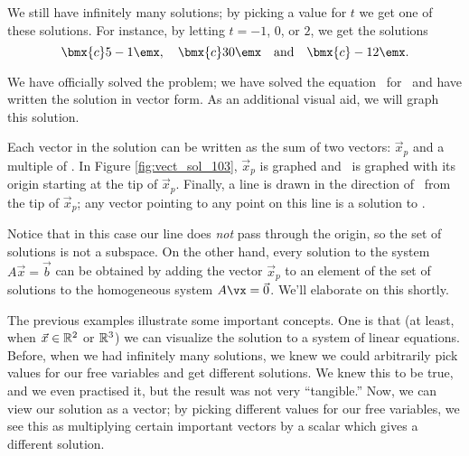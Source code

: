 {We still have infinitely many solutions; by picking a value for $t$ we get one of these solutions. For instance, by letting $t= -1$, $0$, or $2$, we get the solutions 
\[
\bmx{c} 5\\-1\emx, \quad \bmx{c} 3\\0\emx \quad \text{and} \quad \bmx{c} -1\\2\emx.
\]


We have officially solved the problem; we have solved the equation \ttaxb\ for \vx\ and have written the solution in vector form. As an additional visual aid, we will graph this solution. 

Each vector in the solution can be written as the sum of two vectors: $\vec{x}_p$ and a multiple of \vv. In Figure \ref{fig:vect_sol_103}, $\vec{x}_p$ is graphed and \vv\ is graphed with its origin starting at the tip of $\vec{x}_p$. Finally, a line is drawn in the direction of \vv\ from the tip of $\vec{x}_p$; any vector pointing to any point on this line is a solution to \ttaxb.


Notice that in this case our line does \textit{not} pass through the origin, so the set of solutions is not a subspace. On the other hand, every solution to the system $A\vec x = \vec b$ can be obtained by adding the vector $\vec{x}_p$ to an element of the set of solutions to the homogeneous system $A\vx = \vec 0$. We'll elaborate on this shortly.
}

\medskip

The previous examples illustrate some important concepts. One is that (at least, when $\vec x\in \mathbb{R}^2$ or $\mathbb{R}^3$) we can visualize the solution to a system of linear equations. Before, when we had infinitely many solutions, we knew we could arbitrarily pick values for our free variables and get different solutions. We knew this to be true, and we even practised it, but the result was not very ``tangible.'' Now, we can view our solution as a vector; by picking different values for our free variables, we see this as multiplying certain important vectors by a scalar which gives a different solution.

